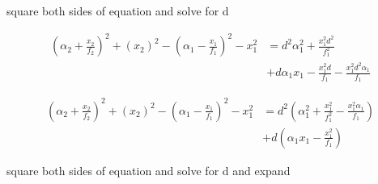 \documentclass[main.tex]{subfiles}
\begin{document}
square both sides of equation and solve for d

\begin{equation}
\begin{aligned}
(\alpha_2 + \frac{x_2}{f_2})^2 + (x_2)^2 - (\alpha_1 - \frac{x_1}{f_1})^2 -x_1^2 & = d^2\alpha_1^2 + \frac{x_1^2 d^2}{f_1^2}\\ 
                                                                               & + d \alpha_1 x_1 - \frac{x_1^2 d}{f_1} - \frac{x_1^2 d^2 \alpha_1}{f_1}
\end{aligned}
\end{equation}

\begin{equation}
\begin{aligned}
(\alpha_2 + \frac{x_2}{f_2})^2 + (x_2)^2 - (\alpha_1 - \frac{x_1}{f_1})^2 -x_1^2 & = d^2(\alpha_1^2 + \frac{x_1^2}{f_1^2} - \frac{x_1^2\alpha_1}{f_1})\\ 
                                                                                 & + d(\alpha_1 x_1 - \frac{x_1^2}{f_1})
\end{aligned}
\end{equation}

square both sides of equation and solve for d and expand




\end{document}
